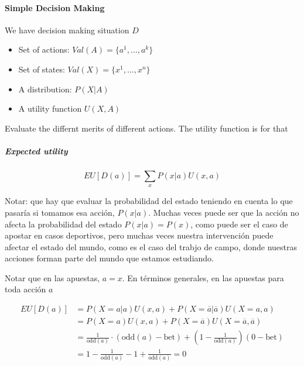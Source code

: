 
\paragraph{Simple Decision Making} We have decision making situation $D$

\begin{itemize}
 \item Set of actions: $Val(A) = \{a^1,\dots,a^k \}$
 \item Set of states:  $Val(X) = \{x^1,\dots,x^n \}$
 \item A distribution: $P(X|A)$
 \item A utility function $U(X,A)$
\end{itemize}

Evaluate the differnt merits of different actions.
The utility function is for that

\vspace{0.3cm}

\subparagraph{Expected utility}

\begin{equation}\label{eq:expectedUtility}
 EU[D(a)] = \sum_x P(x|a)U(x,a)
\end{equation}

Notar: que hay que evaluar la probabilidad del estado teniendo en cuenta lo que pasar\'ia si tomamos esa acci\'on, $P(x|a)$.
Muchas veces puede ser que la acci\'on no afecta la probabilidad del estado $P(x|a) = P(x)$, como puede ser el caso de apostar en casos deportivos, pero muchas veces nuestra intervenci\'on puede afectar el estado del mundo, como es el caso del trabjo de campo, donde nuestras acciones forman parte del mundo que estamos estudiando.

\vspace{0.3cm}

Notar que en las apuestas, $a = x$.
En t\'erminos generales, en las apuestas para toda acci\'on $a$

\begin{equation}
\begin{split}
 EU[D(a)] & = P(X=a|a) U(x, a) +  P(X = \overline{a}| \overline{a}) U(X=a, a) \\
  & = P(X=a) U(x, a) +  P(X = \overline{a}) U(X=\overline{a}, \overline{a}) \\
 & = \frac{1}{\text{odd}(a)} \cdot ( \text{odd}(a) - \text{bet}) + \left( 1 - \frac{1}{\text{odd}(a)} \right) \left( 0 - \text{bet} \right) \\
 & = 1 - \frac{1}{\text{odd}(a)} - 1 + \frac{1}{\text{odd}(a)} = 0
\end{split}
\end{equation}

